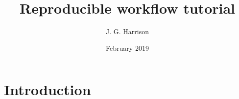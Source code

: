 \documentclass{article}
\title{Reproducible workflow tutorial}
\author{J. G. Harrison}
\date{February 2019}
\begin{document}
\maketitle

\section{Introduction}
\end{document}

